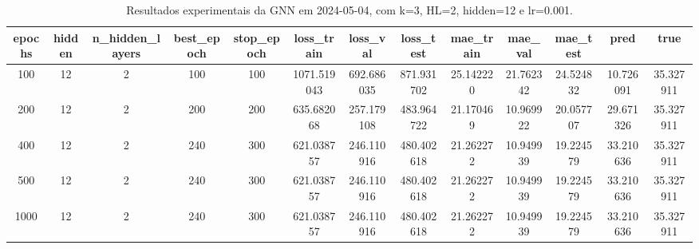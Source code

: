 \begin{table}[h]
\centering
\caption{Resultados experimentais da GNN em 2024-05-04, com k=3, HL=2, hidden=12 e lr=0.001.}
\label{tab:gnn_results_k3_hl2_h12_d20240504}
\begin{tabular}{ccccccccccccc}
\toprule
epochs & hidden & n\_hidden\_layers & best\_epoch & stop\_epoch & loss\_train & loss\_val & loss\_test & mae\_train & mae\_val & mae\_test & pred & true \\
\midrule
100 & 12 & 2 & 100 & 100 & 1071.519043 & 692.686035 & 871.931702 & 25.142220 & 21.762342 & 24.524832 & 10.726091 & 35.327911 \\
200 & 12 & 2 & 200 & 200 & 635.682068 & 257.179108 & 483.964722 & 21.170469 & 10.969922 & 20.057707 & 29.671326 & 35.327911 \\
400 & 12 & 2 & 240 & 300 & 621.038757 & 246.110916 & 480.402618 & 21.262272 & 10.949939 & 19.224579 & 33.210636 & 35.327911 \\
500 & 12 & 2 & 240 & 300 & 621.038757 & 246.110916 & 480.402618 & 21.262272 & 10.949939 & 19.224579 & 33.210636 & 35.327911 \\
1000 & 12 & 2 & 240 & 300 & 621.038757 & 246.110916 & 480.402618 & 21.262272 & 10.949939 & 19.224579 & 33.210636 & 35.327911 \\
\bottomrule
\end{tabular}
\end{table}
